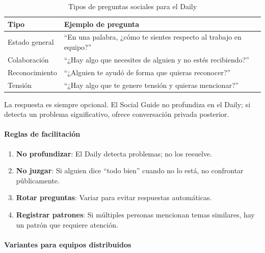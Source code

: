 \begin{table}[h]
    \centering
    \small
    \begin{tabularx}{\textwidth}{|l|X|}
        \hline
        \textbf{Tipo} & \textbf{Ejemplo de pregunta}                                        \\
        \hline
        Estado general
                      & ``En una palabra, ¿cómo te sientes respecto al trabajo en equipo?'' \\
        \hline
        Colaboración
                      & ``¿Hay algo que necesites de alguien y no estés recibiendo?''       \\
        \hline
        Reconocimiento
                      & ``¿Alguien te ayudó de forma que quieras reconocer?''               \\
        \hline
        Tensión
                      & ``¿Hay algo que te genere tensión y quieras mencionar?''            \\
        \hline
    \end{tabularx}
    \caption{Tipos de preguntas sociales para el Daily}
    \label{tab:preguntas-daily-social}
\end{table}

\FloatBarrier

La respuesta es siempre opcional. El Social Guide no profundiza en el Daily; si detecta un problema significativo, ofrece conversación privada posterior.

\paragraph{Reglas de facilitación}
\begin{enumerate}
    \item \textbf{No profundizar}: El Daily detecta problemas; no los resuelve.
    \item \textbf{No juzgar}: Si alguien dice ``todo bien'' cuando no lo está, no confrontar públicamente.
    \item \textbf{Rotar preguntas}: Variar para evitar respuestas automáticas.
    \item \textbf{Registrar patrones}: Si múltiples personas mencionan temas similares, hay un patrón que requiere atención.
\end{enumerate}

\paragraph{Variantes para equipos distribuidos}

